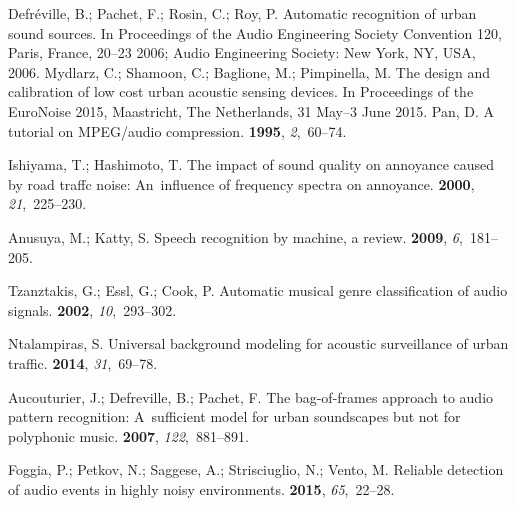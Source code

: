 \documentclass[sensors,article,accept,moreauthors,pdftex,10pt,a4paper]{mdpi}
\begin{document}
\begin{thebibliography}{999}
Defr{\'e}ville, B.; Pachet, F.; Rosin, C.; Roy, P.
\newblock Automatic recognition of urban sound sources.
\newblock  In Proceedings of the Audio Engineering Society Convention 120, {Paris, France, 20--23} 2006;   Audio Engineering Society: {New York, NY, USA,}  2006.
Mydlarz, C.; Shamoon, C.; Baglione, M.; Pimpinella, M.
\newblock The design and calibration of low cost urban acoustic sensing
  devices.
\newblock  In Proceedings of the EuroNoise 2015, {Maastricht, The Netherlands, 31 May--3 June} 2015.
Pan, D.
\newblock A tutorial on MPEG/audio compression.
 {\bf 1995}, {\em 2},~60--74.

Ishiyama, T.; Hashimoto, T.
\newblock The impact of sound quality on annoyance caused by road traffc noise:
  An~influence of frequency spectra on annoyance.
 {\bf 2000}, {\em 21},~225--230.

Anusuya, M.; Katty, S.
\newblock Speech recognition by machine, a review.
 {\bf 2009}, {\em 6},~181--205.

Tzanztakis, G.; Essl, G.; Cook, P.
\newblock Automatic musical genre classification of audio signals.
 {\bf 2002},
  {\em 10},~293--302.

Ntalampiras, S.
\newblock Universal background modeling for acoustic surveillance of urban
  traffic.
 {\bf 2014}, {\em 31},~69--78.

Aucouturier, J.; Defreville, B.; Pachet, F.
\newblock The bag-of-frames approach to audio pattern recognition: A~sufficient
  model for urban soundscapes but not for polyphonic music.
 {\bf 2007}, {\em 122},~881--891.

Foggia, P.; Petkov, N.; Saggese, A.; Strisciuglio, N.; Vento, M.
\newblock Reliable detection of audio events in highly noisy environments.
 {\bf 2015}, {\em 65},~22--28.


\end{thebibliography}
\end{document}
